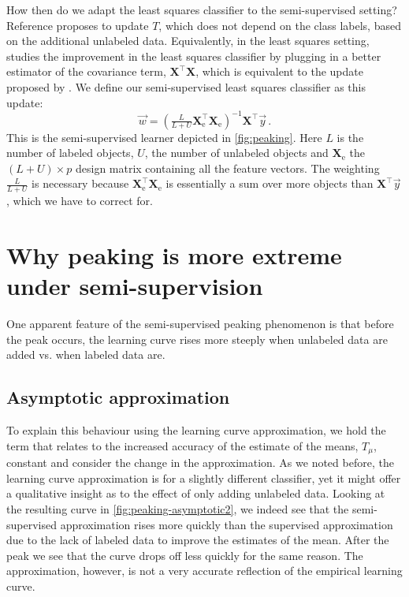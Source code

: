\documentclass[runningheads,a4paper]{llncs}\usepackage[]{graphicx}\usepackage[]{color}
\begin{document}
How then do we adapt the least squares classifier to the semi-supervised setting? Reference \cite{Fan2008} proposes to update $T$, which does not depend on the class labels, based on the additional unlabeled data. Equivalently, in the least squares setting, \cite{Shaffer1991} studies the improvement in the least squares classifier by plugging in a better estimator of the covariance term, $\mathbf{X}^\top \mathbf{X}$, which is equivalent to the update proposed by \cite{Fan2008}. We define our semi-supervised least squares classifier as this update:
\begin{equation}
\vec{w} = (\tfrac{L}{L+U} \mathbf{X}_\textrm{e}^\top \mathbf{X}_\textrm{e})^{-1} \mathbf{X}^\top \vec{y} \,. \label{eq:solutionsemisupervised}
\end{equation}
This is the semi-supervised learner depicted in \cref{fig:peaking}. Here $L$ is the number of labeled objects, $U$, the number of unlabeled objects and $\mathbf{X}_\textrm{e}$ the $(L+U) \times p$ design matrix containing all the feature vectors. The weighting $\tfrac{L}{L+U}$ is necessary because $\mathbf{X}_\textrm{e}^\top \mathbf{X}_\textrm{e}$ is essentially a sum over more objects than $\mathbf{X}^\top \vec{y}$, which we have to correct for.

\section{Why peaking is more extreme under semi-supervision} \label{section:incline}
One apparent feature of the semi-supervised peaking phenomenon is that before the peak occurs, the learning curve rises more steeply when unlabeled data are added vs. when labeled data are.

\subsection{Asymptotic approximation} \label{section:inclineasymptotic}
To explain this behaviour using the learning curve approximation, we hold the term that relates to the increased accuracy of the estimate of the means, $T_\mu$, constant and consider the change in the approximation. As we noted before, the learning curve approximation is for a slightly different classifier, yet it might offer a qualitative insight as to the effect of only adding unlabeled data. Looking at the resulting curve in \cref{fig:peaking-asymptotic2}, we indeed see that the semi-supervised approximation rises more quickly than the supervised approximation due to the lack of labeled data to improve the estimates of the mean. After the peak we see that the curve drops off less quickly for the same reason. The approximation, however, is not a very accurate reflection of the empirical learning curve.
\end{document}
